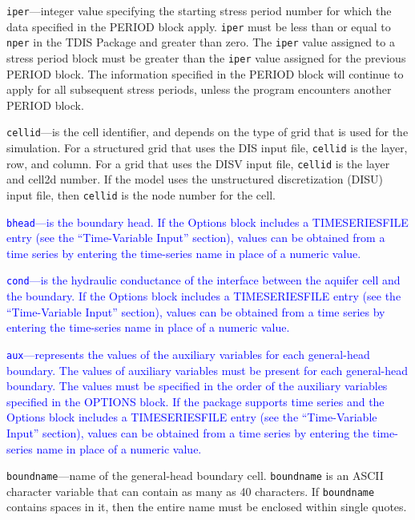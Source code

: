 \begin{description}
\item \texttt{iper}---integer value specifying the starting stress period number for which the data specified in the PERIOD block apply.  \texttt{iper} must be less than or equal to \texttt{nper} in the TDIS Package and greater than zero.  The \texttt{iper} value assigned to a stress period block must be greater than the \texttt{iper} value assigned for the previous PERIOD block.  The information specified in the PERIOD block will continue to apply for all subsequent stress periods, unless the program encounters another PERIOD block.

\item \texttt{cellid}---is the cell identifier, and depends on the type of grid that is used for the simulation.  For a structured grid that uses the DIS input file, \texttt{cellid} is the layer, row, and column.   For a grid that uses the DISV input file, \texttt{cellid} is the layer and cell2d number.  If the model uses the unstructured discretization (DISU) input file, then \texttt{cellid} is the node number for the cell.

\item \textcolor{blue}{\texttt{bhead}---is the boundary head. If the Options block includes a TIMESERIESFILE entry (see the ``Time-Variable Input'' section), values can be obtained from a time series by entering the time-series name in place of a numeric value.}

\item \textcolor{blue}{\texttt{cond}---is the hydraulic conductance of the interface between the aquifer cell and the boundary. If the Options block includes a TIMESERIESFILE entry (see the ``Time-Variable Input'' section), values can be obtained from a time series by entering the time-series name in place of a numeric value.}

\item \textcolor{blue}{\texttt{aux}---represents the values of the auxiliary variables for each general-head boundary. The values of auxiliary variables must be present for each general-head boundary. The values must be specified in the order of the auxiliary variables specified in the OPTIONS block.  If the package supports time series and the Options block includes a TIMESERIESFILE entry (see the ``Time-Variable Input'' section), values can be obtained from a time series by entering the time-series name in place of a numeric value.}

\item \texttt{boundname}---name of the general-head boundary cell.  \texttt{boundname} is an ASCII character variable that can contain as many as 40 characters.  If \texttt{boundname} contains spaces in it, then the entire name must be enclosed within single quotes.

\end{description}


